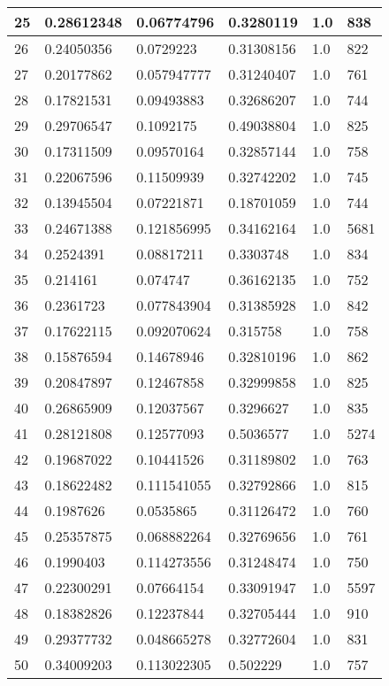\begin{longtable}{|l|l|l|l|l|l|}
25 & 0.28612348 & 0.06774796 & 0.3280119 & 1.0 & 838 \\ \hline 
26 & 0.24050356 & 0.0729223 & 0.31308156 & 1.0 & 822 \\ \hline 
27 & 0.20177862 & 0.057947777 & 0.31240407 & 1.0 & 761 \\ \hline 
28 & 0.17821531 & 0.09493883 & 0.32686207 & 1.0 & 744 \\ \hline 
29 & 0.29706547 & 0.1092175 & 0.49038804 & 1.0 & 825 \\ \hline 
30 & 0.17311509 & 0.09570164 & 0.32857144 & 1.0 & 758 \\ \hline 
31 & 0.22067596 & 0.11509939 & 0.32742202 & 1.0 & 745 \\ \hline 
32 & 0.13945504 & 0.07221871 & 0.18701059 & 1.0 & 744 \\ \hline 
33 & 0.24671388 & 0.121856995 & 0.34162164 & 1.0 & 5681 \\ \hline 
34 & 0.2524391 & 0.08817211 & 0.3303748 & 1.0 & 834 \\ \hline 
35 & 0.214161 & 0.074747 & 0.36162135 & 1.0 & 752 \\ \hline 
36 & 0.2361723 & 0.077843904 & 0.31385928 & 1.0 & 842 \\ \hline 
37 & 0.17622115 & 0.092070624 & 0.315758 & 1.0 & 758 \\ \hline 
38 & 0.15876594 & 0.14678946 & 0.32810196 & 1.0 & 862 \\ \hline 
39 & 0.20847897 & 0.12467858 & 0.32999858 & 1.0 & 825 \\ \hline 
40 & 0.26865909 & 0.12037567 & 0.3296627 & 1.0 & 835 \\ \hline 
41 & 0.28121808 & 0.12577093 & 0.5036577 & 1.0 & 5274 \\ \hline 
42 & 0.19687022 & 0.10441526 & 0.31189802 & 1.0 & 763 \\ \hline 
43 & 0.18622482 & 0.111541055 & 0.32792866 & 1.0 & 815 \\ \hline 
44 & 0.1987626 & 0.0535865 & 0.31126472 & 1.0 & 760 \\ \hline 
45 & 0.25357875 & 0.068882264 & 0.32769656 & 1.0 & 761 \\ \hline 
46 & 0.1990403 & 0.114273556 & 0.31248474 & 1.0 & 750 \\ \hline 
47 & 0.22300291 & 0.07664154 & 0.33091947 & 1.0 & 5597 \\ \hline 
48 & 0.18382826 & 0.12237844 & 0.32705444 & 1.0 & 910 \\ \hline 
49 & 0.29377732 & 0.048665278 & 0.32772604 & 1.0 & 831 \\ \hline 
50 & 0.34009203 & 0.113022305 & 0.502229 & 1.0 & 757 \\ \hline 
\end{longtable}